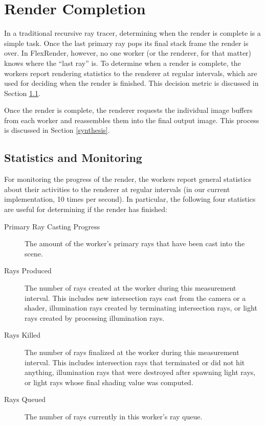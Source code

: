 \documentclass[12pt]{ucthesis}
\begin{document}
\section{Render Completion}
\label{completion}

In a traditional recursive ray tracer, determining when the render is complete
is a simple task. Once the last primary ray pops its final stack frame
the render is over. In FlexRender, however, no one worker (or the renderer, for
that matter) knows where the ``last ray'' is. To determine when a render is
complete, the workers report rendering statistics to the renderer at regular
intervals, which are used for deciding when the render is finished. This decision
metric is discussed in Section \ref{stats}.

Once the render is complete, the renderer requests the individual image buffers
from each worker and reassembles them into the final output image. This process
is discussed in Section \ref{synthesis}.

\subsection{Statistics and Monitoring}
\label{stats}

For monitoring the progress of the render, the workers report general statistics
about their activities to the renderer at regular intervals (in our current
implementation, 10 times per second). In particular, the following four
statistics are useful for determining if the render has finished:

\begin{description}
   \item[Primary Ray Casting Progress] The amount of the worker's primary rays
      that have been cast into the scene.
   \item[Rays Produced] The number of rays created at the worker during this
      measurement interval. This includes new intersection rays cast from the
      camera or a shader, illumination rays created by terminating intersection
      rays, or light rays created by processing illumination rays.
   \item[Rays Killed] The number of rays finalized at the worker during this
      measurement interval. This includes intersection rays that terminated or
      did not hit anything, illumination rays that were destroyed after spawning
      light rays, or light rays whose final shading value was computed.
   \item[Rays Queued] The number of rays currently in this worker's ray queue.
\end{description}
\end{document}
